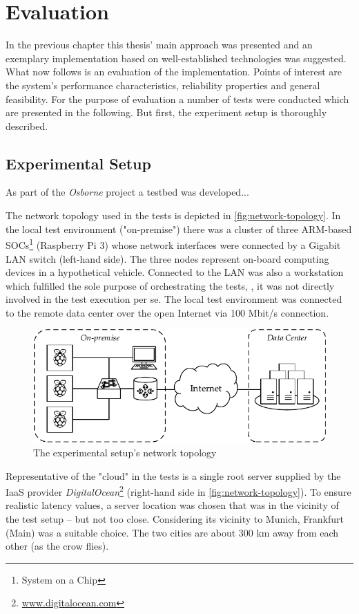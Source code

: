 
\chapter{Evaluation}\label{chapter:evaluation}

In the previous chapter this thesis' main approach was presented and an exemplary implementation based on well-established technologies was suggested. What now follows is an evaluation of the implementation. Points of interest are the system's performance characteristics, reliability properties and general feasibility. For the purpose of evaluation a number of tests were conducted which are presented in the following. But first, the experiment setup is thoroughly described.


\section{Experimental Setup}\label{sec:testsetup}

As part of the \emph{Osborne}  project a testbed was developed...

The network topology used in the tests is depicted in \autoref{fig:network-topology}. In the local test environment ("on-premise") there was a cluster of three ARM-based SOCs\footnote{System on a Chip} (Raspberry Pi 3) whose network interfaces were connected by a Gigabit LAN switch (left-hand side). The three nodes represent on-board computing devices in a hypothetical vehicle. Connected to the LAN was also a workstation which fulfilled the sole purpose of orchestrating the tests, \ie , it was not directly involved in the test execution per se. The local test environment was connected to the remote data center over the open Internet via 100 Mbit/s connection.

\begin{figure}[htpb]
  \centering
  \includegraphics[width=\textwidth]{figures/network-setup}
  \caption[Network topology of the experimental setup]{The experimental setup's network topology}\label{fig:network-topology}
\end{figure}
%
Representative of the "cloud" in the tests is a single root server supplied by the IaaS provider \emph{DigitalOcean}\footnote{\url{www.digitalocean.com}} (right-hand side in \autoref{fig:network-topology}). To ensure realistic latency values, a server location was chosen that was in the vicinity of the test setup -- but not too close. Considering its vicinity to Munich, Frankfurt (Main) was a suitable choice. The two cities are about 300 km away from each other (as the crow flies).

